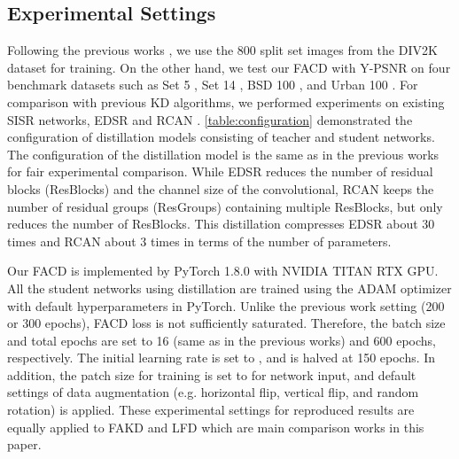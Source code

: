 \documentclass[10pt,twocolumn,letterpaper]{article}
\begin{document}
\subsection{Experimental Settings}
Following the previous works \cite{san, fakd, edsr2, lsfd, csd2021, RCAN}, we use the 800 split set images from the DIV2K dataset \cite{div2k} for training. On the other hand, we test our FACD with Y-PSNR on four benchmark datasets such as Set 5 \cite{set5}, Set 14 \cite{set14}, BSD 100 \cite{b100}, and Urban 100 \cite{urban100}. For comparison with previous KD algorithms, we performed experiments on existing SISR networks, EDSR \cite{edsr2} and RCAN \cite{RCAN}. \cref{table:configuration} demonstrated the configuration of distillation models consisting of teacher and student networks. The configuration of the distillation model is the same as in the previous works for fair experimental comparison. While EDSR reduces the number of residual blocks (ResBlocks) and the channel size of the convolutional, RCAN keeps the number of residual groups (ResGroups) containing multiple ResBlocks, but only reduces the number of ResBlocks. This distillation compresses EDSR about 30 times and RCAN about 3 times in terms of the number of parameters.

Our FACD is implemented by PyTorch 1.8.0 with NVIDIA TITAN RTX GPU. All the student networks using distillation are trained using the ADAM optimizer with default hyperparameters in PyTorch. Unlike the previous work setting (200 \cite{fakd} or 300 \cite{lsfd} epochs), FACD loss is not sufficiently saturated. Therefore, the batch size and total epochs are set to 16 (same as in the previous works) and 600 epochs, respectively. The initial learning rate is set to , and is halved at 150 epochs. In addition, the patch size for training is set to  for network input, and default settings of data augmentation (e.g. horizontal flip, vertical flip, and random rotation) is applied. These experimental settings for reproduced results are equally applied to FAKD\cite{fakd} and LFD\cite{lsfd} which are main comparison works in this paper. 
\end{document}

